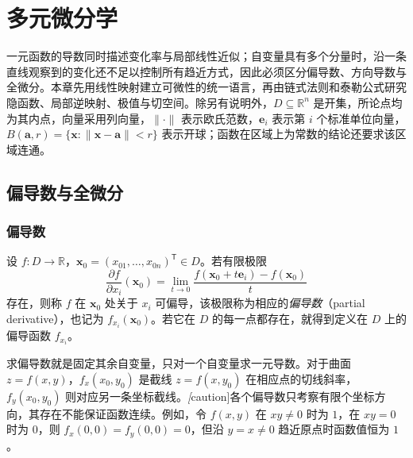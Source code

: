 \documentclass[UTF8,12pt,a4paper,fontset=fandol]{ctexbook}
\begin{document}
\chapter{多元微分学}
\label{chap:multivariable-differential-calculus}

一元函数的导数同时描述变化率与局部线性近似；自变量具有多个分量时，沿一条直线观察到的变化还不足以控制所有趋近方式，因此必须区分偏导数、方向导数与全微分。本章先用线性映射建立可微性的统一语言，再由链式法则和泰勒公式研究隐函数、局部逆映射、极值与切空间。除另有说明外，$D\subseteq\mathbb R^n$ 是开集，所论点均为其内点，向量采用列向量，$\|\cdot\|$ 表示欧氏范数，$\boldsymbol e_i$ 表示第 $i$ 个标准单位向量，$B(\boldsymbol a,r)=\{\boldsymbol x:\|\boldsymbol x-\boldsymbol a\|<r\}$ 表示开球；函数在区域上为常数的结论还要求该区域连通。

\section{偏导数与全微分}
\label{sec:partial-derivatives-and-total-differentials}


\subsection{偏导数}
\label{subsec:partial-derivatives}

\begin{definition}
\label{def:multivariable-partial-derivative}
设 $f:D\to\mathbb R$，$\boldsymbol x_0=(x_{01},\ldots,x_{0n})^{\mathsf T}\in D$。若有限极限
\[
    \frac{\partial f}{\partial x_i}(\boldsymbol x_0)
    =\lim_{t\to0}\frac{f(\boldsymbol x_0+t\boldsymbol e_i)-f(\boldsymbol x_0)}{t}
\]
存在，则称 $f$ 在 $\boldsymbol x_0$ 处关于 $x_i$ 可偏导，该极限称为相应的\emph{偏导数}（partial derivative），也记为 $f_{x_i}(\boldsymbol x_0)$。若它在 $D$ 的每一点都存在，就得到定义在 $D$ 上的偏导函数 $f_{x_i}$。
\end{definition}

求偏导数就是固定其余自变量，只对一个自变量求一元导数。对于曲面 $z=f(x,y)$，$f_x(x_0,y_0)$ 是截线 $z=f(x,y_0)$ 在相应点的切线斜率，$f_y(x_0,y_0)$ 则对应另一条坐标截线。\emph[caution]{各个偏导数只考察有限个坐标方向，其存在不能保证函数连续。}例如，令 $f(x,y)$ 在 $xy\ne0$ 时为 $1$，在 $xy=0$ 时为 $0$，则 $f_x(0,0)=f_y(0,0)=0$，但沿 $y=x\ne0$ 趋近原点时函数值恒为 $1$。
\end{document}
